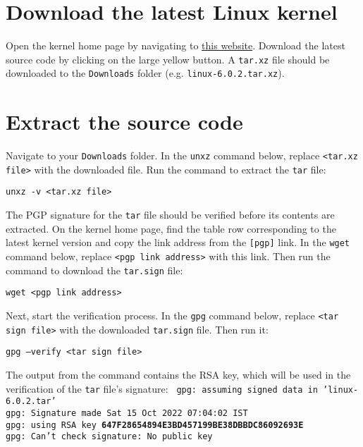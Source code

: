\documentclass[12pt,a4paper]{report}
\begin{document}
\section{Download the latest Linux kernel}
Open the kernel home page by navigating to \href{https://www.kernel.org/}{this website}. Download the latest source code by clicking on the large yellow button.
\newline
\newline
A \texttt{tar.xz} file should be downloaded to the \texttt{Downloads} folder (e.g. \texttt{\small linux-6.0.2.tar.xz}). 

\section{Extract the source code}
Navigate to your \texttt{Downloads} folder. In the \texttt{unxz} command below, replace \texttt{<tar.xz file>} with the downloaded file. Run the command to extract the \texttt{tar} file:
\newline
\newline
\centerline{\texttt{unxz -v <tar.xz file>}}
\newline
\newline 
The PGP signature for the \texttt{tar} file should be verified before its contents are extracted. On the kernel home page, find the table row corresponding to the latest kernel version and copy the link address from the \texttt{[pgp]} link. In the \texttt{wget} command below, replace \texttt{<pgp link address>} with this link. Then run the command to download the \texttt{tar.sign} file:
\newline
\newline
\centerline{\texttt{wget <pgp link address>}}
\newline
\newline 
Next, start the verification process. In the \texttt{gpg} command below, replace \texttt{<tar sign file>} with the downloaded \texttt{tar.sign} file. Then run it:
\newline
\newline
\centerline{\texttt{gpg --verify <tar sign file>}}
\newline
\newline 
The output from the command contains the RSA key, which will be used in the verification of the \texttt{tar} file's signature:
\newline
\newline
\texttt{
gpg: assuming signed data in 'linux-6.0.2.tar'
\\
gpg: Signature made Sat 15 Oct 2022 07:04:02 IST
\\
gpg:                using RSA key \textbf{647F28654894E3BD457199BE38DBBDC86092693E}
\\
gpg: Can't check signature: No public key
}
\end{document}
